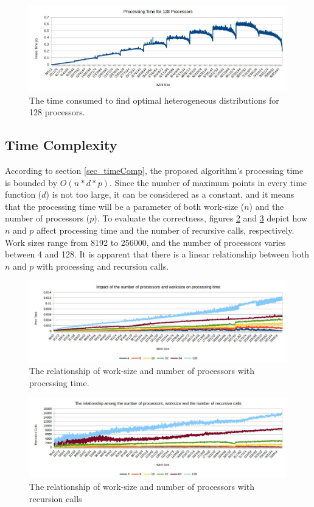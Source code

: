 \documentclass[12pt]{article}
\begin{document}
\begin{figure}[!t]
\centering
\includegraphics[width=6in]{Images/procTime_set128.jpg}
\caption{The time consumed to find optimal heterogeneous distributions for 128 processors.}
\label{fig:pTime128}
\end{figure}

\subsection{Time Complexity}
According to section \ref{sec_timeComp}, the proposed algorithm's processing time is bounded by $O(n * d * p)$. Since the number of maximum points in every time function ($d$) is not too large, it can be considered as a constant, and it means that the processing time will be a parameter of both work-size ($n$) and the number of processors ($p$). To evaluate the correctness, figures \ref{fig:n_p_time} and \ref{fig:n_p_recCall} depict how $n$ and $p$ affect processing time and the number of recursive calls, respectively. Work sizes range from 8192 to 256000, and the number of processors varies between 4 and 128. It is apparent that there is a linear relationship between both $n$ and $p$ with processing and recursion calls. 

\begin{figure}[!t]
\centering
\includegraphics[width=6in]{Images/n_p_time.jpg}
\caption{The relationship of work-size and number of processors with processing time.}
\label{fig:n_p_time}
\end{figure}

\begin{figure}[!t]
\centering
\includegraphics[width=6in]{Images/n_p_recCall.jpg}
\caption{The relationship of work-size and number of processors with recursion calls}
\label{fig:n_p_recCall}
\end{figure}
\end{document}
